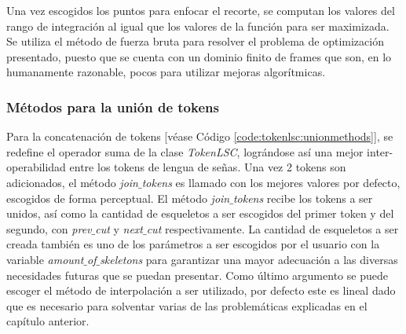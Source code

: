 Una vez escogidos los puntos para enfocar el recorte, se computan los valores del rango de integración al igual que los valores de la función para ser maximizada. Se utiliza el método de fuerza bruta para resolver el problema de optimización presentado, puesto que se cuenta con un dominio finito de frames que son, en lo humanamente razonable, pocos para utilizar mejoras algorítmicas.

\subsubsection{Métodos para la unión de tokens}
 
 Para la concatenación de tokens [véase Código \ref{code:tokenlsc:unionmethods}], se redefine el operador suma de la clase \textit{TokenLSC}, lográndose así una mejor inter-operabilidad entre los tokens de lengua de señas. Una vez 2 tokens son adicionados, el método \textit{join$\_{}$tokens} es llamado con los mejores valores por defecto, escogidos de forma perceptual. El método \textit{join$\_{}$tokens} recibe los tokens a ser unidos, así como la cantidad de esqueletos a ser escogidos del primer token y del segundo, con \textit{prev$\_{}$cut} y \textit{next$\_{}$cut} respectivamente. La cantidad de esqueletos a ser creada también es uno de los parámetros a ser escogidos por el usuario con la variable \textit{amount$\_{}$of$\_{}$skeletons} para garantizar una mayor adecuación a las diversas necesidades futuras que se puedan presentar. Como último argumento se puede escoger el método de interpolación a ser utilizado, por defecto este es lineal dado que es necesario para solventar varias de las problemáticas explicadas en el capítulo anterior.
 
